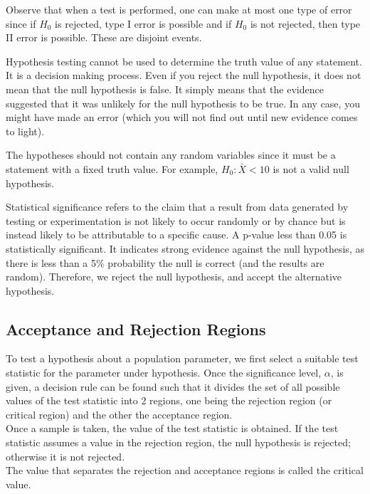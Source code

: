 \begin{note}
\end{note}
Observe that when a test is performed, one can make at most one type of error since if $H_0$ is rejected, type I error is possible and if $H_0$ is not rejected, then type II error is possible. These are disjoint events. 
\begin{note}
\end{note}
Hypothesis testing cannot be used to determine the truth value of any statement. It is a decision making process. Even if you reject the null hypothesis, it does not mean that the null hypothesis is false. It simply means that the evidence suggested that it was unlikely for the null hypothesis to be true. In any case, you might have made an error (which you will not find out until new evidence comes to light).
\begin{note}
\end{note}
{\color{blue}The hypotheses should not contain any random variables since it must be a statement with a fixed truth value. For example, $H_0: \bar{X} < 10$ is not a valid null hypothesis.}
\begin{note}
\end{note}
Statistical significance refers to the claim that a result from data generated by testing or experimentation is not likely to occur randomly or by chance but is instead likely to be attributable to a specific cause. A p-value less than 0.05 is statistically significant. It indicates strong evidence against the null hypothesis, as there is less than a 5$\%$ probability the null is correct (and the results are random). Therefore, we reject the null hypothesis, and accept the alternative hypothesis.
\subsection{Acceptance and Rejection Regions}
To test a hypothesis about a population parameter, we first select a suitable test statistic for the parameter under hypothesis. Once the significance level, $\alpha$, is given, a decision rule can be found such that it divides the set of all possible values of the test statistic into 2 regions, one being the rejection region (or critical region) and the other the acceptance region. \\
Once a sample is taken, the value of the test statistic is obtained. If the test statistic assumes a value in the rejection region, the null hypothesis is rejected; otherwise it is not rejected. \\
The value that separates the rejection and acceptance regions is called the critical value.

